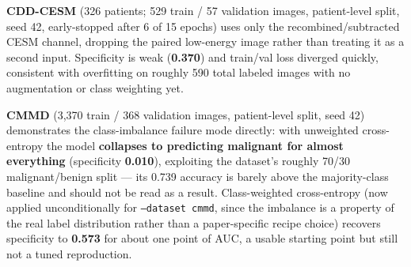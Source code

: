 \documentclass[11pt]{article}
\begin{document}
\begin{table}[htbp]
  \centering
  \caption{CDD-CESM, CMMD, and BCS-DBT: preliminary single-split smoke-test results, ResNet-18.}
  \label{tab:new-datasets}
\end{table}

\textbf{CDD-CESM} (326 patients; 529 train / 57 validation images,
patient-level split, seed 42, early-stopped after 6 of 15 epochs) uses only
the recombined/subtracted CESM channel, dropping the paired low-energy
image rather than treating it as a second input. Specificity is weak
(\textbf{0.370}) and train/val loss diverged quickly, consistent with
overfitting on roughly 590 total labeled images with no augmentation or
class weighting yet.

\textbf{CMMD} (3,370 train / 368 validation images, patient-level split,
seed 42) demonstrates the class-imbalance failure mode directly: with
unweighted cross-entropy the model \textbf{collapses to predicting
malignant for almost everything} (specificity \textbf{0.010}), exploiting
the dataset's roughly 70/30 malignant/benign split — its 0.739 accuracy is
barely above the majority-class baseline and should not be read as a
result. Class-weighted cross-entropy (now applied unconditionally for
\texttt{--dataset cmmd}, since the imbalance is a property of the real
label distribution rather than a paper-specific recipe choice) recovers
specificity to \textbf{0.573} for about one point of AUC, a usable starting
point but still not a tuned reproduction.
\end{document}
